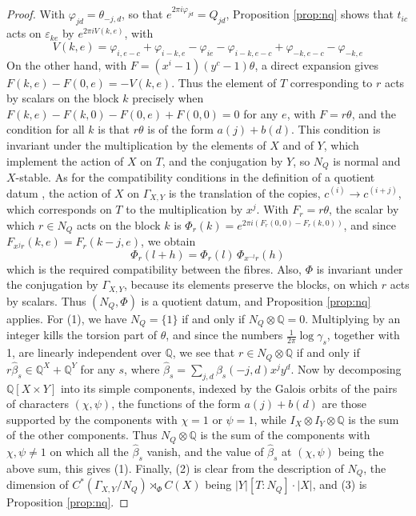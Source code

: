 \documentclass[11pt]{amsart}
\begin{document}
\begin{proof}
With $\varphi_{jd}=\theta_{-j,d}$, so that $e^{2\pi i\varphi_{jd}}=Q_{jd}$, Proposition \ref{prop:nq} shows that $t_{ic}$ acts on $\varepsilon_{ke}$ by $e^{2\pi iV(k,e)}$, with
$$V(k,e)=\varphi_{i,e-c}+\varphi_{i-k,e}-\varphi_{ie}-\varphi_{i-k,e-c}+\varphi_{-k,e-c}-\varphi_{-k,e}$$
On the other hand, with $F=(x^i-1)(y^c-1)\theta$, a direct expansion gives $F(k,e)-F(0,e)=-V(k,e)$. Thus the element of $T$ corresponding to $r$ acts by scalars on the block $k$ precisely when $F(k,e)-F(k,0)-F(0,e)+F(0,0)=0$ for any $e$, with $F=r\theta$, and the condition for all $k$ is that $r\theta$ is of the form $a(j)+b(d)$. This condition is invariant under the multiplication by the elements of $X$ and of $Y$, which implement the action of $X$ on $T$, and the conjugation by $Y$, so $N_Q$ is normal and $X$-stable. As for the compatibility conditions in the definition of a quotient datum \cite[Definition 2.1]{bic}, the action of $X$ on $\Gamma_{X,Y}$ is the translation of the copies, $c^{(i)}\to c^{(i+j)}$, which corresponds on $T$ to the multiplication by $x^j$. With $F_r=r\theta$, the scalar by which $r\in N_Q$ acts on the block $k$ is $\Phi_r(k)=e^{2\pi i(F_r(0,0)-F_r(k,0))}$, and since $F_{x^jr}(k,e)=F_r(k-j,e)$, we obtain
$$\Phi_r(l+h)=\Phi_r(l)\,\Phi_{x^{-l}r}(h)$$
which is the required compatibility between the fibres. Also, $\Phi$ is invariant under the conjugation by $\Gamma_{X,Y}$, because its elements preserve the blocks, on which $r$ acts by scalars. Thus $(N_Q,\Phi)$ is a quotient datum, and Proposition \ref{prop:nq} applies. For (1), we have $N_Q=\{1\}$ if and only if $N_Q\otimes\mathbb Q=0$. Multiplying by an integer kills the torsion part of $\theta$, and since the numbers $\frac{1}{2\pi}\log\gamma_s$, together with 1, are linearly independent over $\mathbb Q$, we see that $r\in N_Q\otimes\mathbb Q$ if and only if $r\hat{\beta}_s\in\mathbb Q^X+\mathbb Q^Y$ for any $s$, where $\hat{\beta}_s=\sum_{j,d}\beta_s(-j,d)x^jy^d$. Now by decomposing $\mathbb Q[X\times Y]$ into its simple components, indexed by the Galois orbits of the pairs of characters $(\chi,\psi)$, the functions of the form $a(j)+b(d)$ are those supported by the components with $\chi=1$ or $\psi=1$, while $I_X\otimes I_Y\otimes\mathbb Q$ is the sum of the other components. Thus $N_Q\otimes\mathbb Q$ is the sum of the components with $\chi,\psi\neq1$ on which all the $\hat{\beta}_s$ vanish, and the value of $\hat{\beta}_s$ at $(\chi,\psi)$ being the above sum, this gives (1). Finally, (2) is clear from the description of $N_Q$, the dimension of $C^*(\Gamma_{X,Y}/N_Q)\rtimes_\Phi C(X)$ being $|Y|[T:N_Q]\cdot|X|$, and (3) is Proposition \ref{prop:nq}.
\end{proof}
\end{document}
